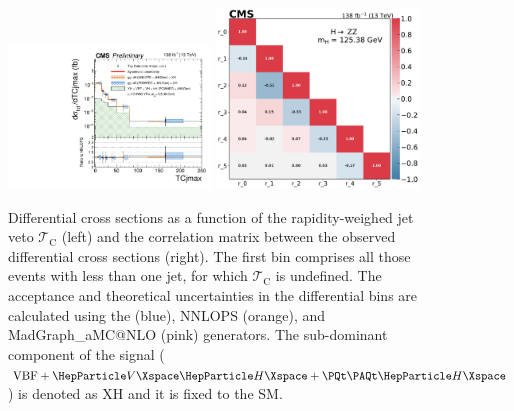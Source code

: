 \begin{center}
	\begin{figure}[!htb]
		\centering
		\includegraphics[width=0.48\textwidth]{Images/H4L/TCjmax_unfoldwith_SM_125_logscale_asimov.pdf}
		\includegraphics[width=0.48\textwidth]{Images/H4L/correlations/corr_TCjmax_v3.pdf}\\
		\caption{
			Differential cross sections as a function of the rapidity-weighed jet veto $\mathcal{T}_{\text{C}}$ (left) and the correlation matrix between the observed differential cross sections (right).
			The first bin comprises all those events with less than one jet, for which $\mathcal{T}_{\text{C}}$ is undefined.
			The acceptance and theoretical uncertainties in the differential bins are calculated using the \POWHEG (blue), NNLOPS (orange), and MadGraph\_aMC@NLO (pink) generators.
			The sub-dominant component of the signal ($\VBF + \VH + \ttH$) is denoted as XH and it is fixed to the SM.
			\label{fig:fidTC}}
	\end{figure}
\end{center}

\clearpage

